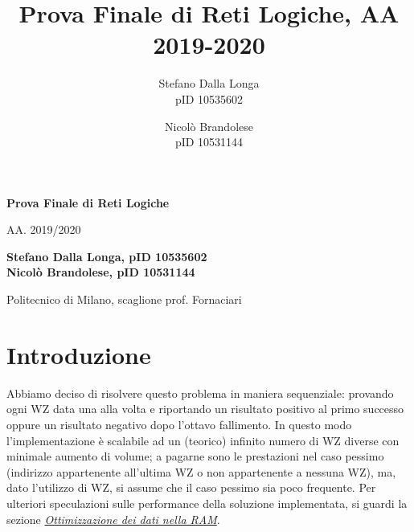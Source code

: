 \documentclass[12pt,a4paper,titlepage]{article}
\author{Stefano Dalla Longa\\pID 10535602 \and Nicolò Brandolese\\pID 10531144}
\date{}
\title{Prova Finale di Reti Logiche, AA 2019-2020}
\begin{document}
	\begin{titlepage}
    \begin{center}
        \vspace*{3cm}
            
        \Huge
        \textbf{Prova Finale di Reti Logiche}
            
        \vspace{0.5cm}
        \LARGE
        AA. 2019/2020
            
        \vspace{1.5cm}
            
        \textbf{Stefano Dalla Longa, pID 10535602 \\ Nicolò Brandolese, pID 10531144}
        
        \vspace{1.2 cm}
        \Large
		Politecnico di Milano, scaglione prof. Fornaciari
            
        \vspace{0.8cm}
            
    \end{center}
\end{titlepage}

	\renewcommand{\contentsname}{Indice}	%

	\tableofcontents
	\clearpage	%
	\section{Introduzione}
   
		Abbiamo deciso di risolvere questo problema in maniera sequenziale: provando ogni WZ data una alla volta e riportando un risultato positivo al primo successo oppure un risultato negativo dopo l'ottavo fallimento.
In questo modo l'implementazione è scalabile ad un (teorico) infinito numero di WZ diverse con minimale aumento di volume; a pagarne sono le prestazioni nel caso pessimo (indirizzo appartenente all'ultima WZ o non appartenente a nessuna WZ), ma, dato l'utilizzo di WZ, si assume che il caso pessimo sia poco frequente.
Per ulteriori speculazioni sulle performance della soluzione implementata, si guardi la sezione \hyperref[sec:ottimizzazione]{\textit{Ottimizzazione dei dati nella RAM}}. %
       
\end{document}
